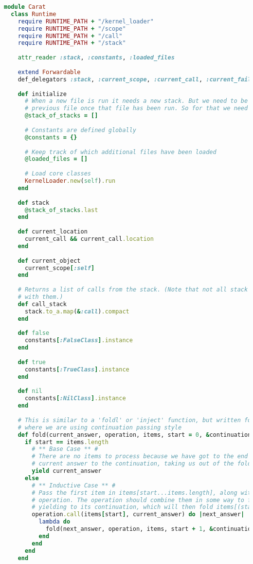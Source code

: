 \begin{lstlisting}[title={\small\ttfamily\bfseries runtime/runtime.rb},language=Ruby]
module Carat
  class Runtime
    require RUNTIME_PATH + "/kernel_loader"
    require RUNTIME_PATH + "/scope"
    require RUNTIME_PATH + "/call"
    require RUNTIME_PATH + "/stack"
    
    attr_reader :stack, :constants, :loaded_files
    
    extend Forwardable
    def_delegators :stack, :current_scope, :current_call, :current_failure_continuation
    
    def initialize
      # When a new file is run it needs a new stack. But we need to be able to return to the 
      # previous file once that file has been run. So for that we need a stack of stacks.
      @stack_of_stacks = []
      
      # Constants are defined globally
      @constants = {}
      
      # Keep track of which additional files have been loaded
      @loaded_files = []
      
      # Load core classes
      KernelLoader.new(self).run
    end
    
    def stack
      @stack_of_stacks.last
    end
    
    def current_location
      current_call && current_call.location
    end
    
    def current_object
      current_scope[:self]
    end
    
    # Returns a list of calls from the stack. (Note that not all stack frames have a call associated
    # with them.)
    def call_stack
      stack.to_a.map(&:call).compact
    end
    
    def false
      constants[:FalseClass].instance
    end
    
    def true
      constants[:TrueClass].instance
    end
    
    def nil
      constants[:NilClass].instance
    end
    
    # This is similar to a 'foldl' or 'inject' function, but written for this specific context
    # where we are using continuation passing style
    def fold(current_answer, operation, items, start = 0, &continuation)
      if start == items.length
        # ** Base Case ** #
        # There are no items to process because we have got to the end of the array, so yield the
        # current answer to the continuation, taking us out of the fold operation
        yield current_answer
      else
        # ** Inductive Case ** #
        # Pass the first item in items[start...items.length], along with the current answer, to the
        # operation. The operation should combine them in some way to form the next answer, before
        # yielding to its continuation, which will then fold items[(start+1)...items.length].
        operation.call(items[start], current_answer) do |next_answer|
          lambda do
            fold(next_answer, operation, items, start + 1, &continuation)
          end
        end
      end
    end
    

\end{lstlisting}
